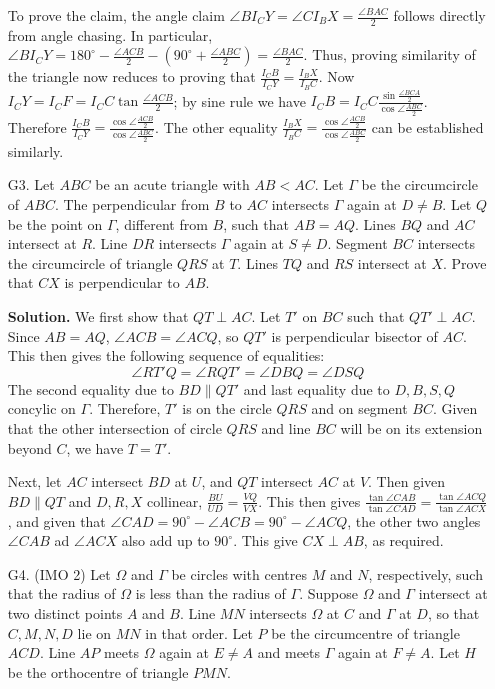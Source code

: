 \documentclass[11pt,a4paper]{article}
\begin{document}
\begin{enumerate}
    	To prove the claim, the angle claim $\angle BI_CY=\angle CI_BX=\frac{\angle BAC}{2}$ follows directly from angle chasing. 
    	In particular, $\angle BI_CY=180^{\circ} - \frac{\angle ACB}{2} - (90^{\circ} + \frac{\angle ABC}{2})
    	=\frac{\angle BAC}{2}$. 
    	Thus, proving similarity of the triangle now reduces to proving that $\frac{I_CB}{I_CY}=\frac{I_BX}{I_BC}$. 
    	Now $I_CY = I_CF = I_CC\tan \frac{\angle ACB}{2}$; 
    	by sine rule we have $I_CB=I_CC\frac{\sin\frac{\angle BCA}{2}}{\cos \angle \frac{ABC}{2}}$. 
    	Therefore $\frac{I_CB}{I_CY}=\frac{\cos \angle \frac{ACB}{2}}{\cos \angle \frac{ABC}{2}}$. 
    	The other equality $\frac{I_BX}{I_BC}=\frac{\cos \angle \frac{ACB}{2}}{\cos \angle \frac{ABC}{2}}$ can be established similarly. 
    	
    	\item [G3.] Let $ABC$ be an acute triangle with $AB < AC$. Let $\Gamma$ be the circumcircle of $ABC$. The perpendicular from $B$ to $AC$ intersects $\Gamma$ again at $D\neq B$. Let $Q$ be the point on $\Gamma$, different from $B$, such that $AB=AQ$. Lines $BQ$ and $AC$ intersect at $R$. Line $DR$ intersects $\Gamma$ again at $S\neq D$. Segment $BC$ intersects the circumcircle of triangle $QRS$ at $T$. Lines $TQ$ and $RS$ intersect at $X$. Prove that $CX$ is perpendicular to $AB$.
    	
    	\textbf{Solution.} 
    	We first show that $QT\perp AC$. 
    	Let $T'$ on $BC$ such that $QT'\perp AC$. 
    	Since $AB=AQ$, $\angle ACB=\angle ACQ$, so $QT'$ is perpendicular bisector of $AC$. 
    	This then gives the following sequence of equalities: 
    	\[
    	\angle RT'Q=\angle RQT'=\angle DBQ=\angle DSQ
    	\]
    	The second equality due to $BD\parallel QT'$ and last equality due to $D, B, S, Q$ concylic on $\Gamma$. 
    	Therefore, $T'$ is on the circle $QRS$ and on segment $BC$. 
    	Given that the other intersection of circle $QRS$ and line $BC$ will be on its extension beyond $C$, 
    	we have $T=T'$. 
    	
    	Next, let $AC$ intersect $BD$ at $U$, and $QT$ intersect $AC$ at $V$. 
    	Then given $BD\parallel QT$ and $D, R, X$ collinear, $\frac{BU}{UD}=\frac{VQ}{VX}$. 
    	This then gives $\frac{\tan\angle CAB}{\tan\angle CAD}=\frac{\tan\angle ACQ}{\tan\angle ACX}$, 
    	and given that $\angle CAD=90^{\circ}-\angle ACB=90^{\circ}-\angle ACQ$, 
    	the other two angles $\angle CAB$ ad $\angle ACX$ also add up to $90^{\circ}$. 
    	This give $CX\perp AB$, as required.  
    	
    	\item [G4.] (IMO 2) 
    	Let $\Omega$ and $\Gamma$ be circles with centres $M$ and $N$, respectively, such that the radius of $\Omega$ is less than the radius of $\Gamma$. Suppose $\Omega$ and $\Gamma$ intersect at two distinct points $A$ and $B$. Line $MN$ intersects $\Omega$ at $C$ and $\Gamma$ at $D$, so that $C, M, N, D$ lie on $MN$ in that order. Let $P$ be the circumcentre of triangle $ACD$. Line $AP$ meets $\Omega$ again at $E\neq A$ and meets $\Gamma$ again at $F\neq A$. Let $H$ be the orthocentre of triangle $PMN$.
    	

\end{enumerate}
\end{document}
